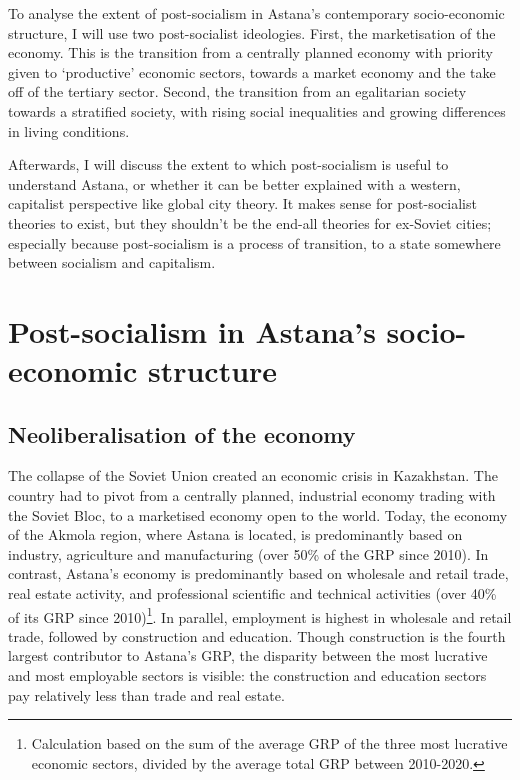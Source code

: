 \documentclass{article}
\begin{document}
To analyse the extent of post-socialism in Astana's contemporary socio-economic structure, I will use two post-socialist ideologies. 
First, the marketisation of the economy. This is the transition from a centrally planned economy with priority given to `productive' economic sectors, towards a market economy and the take off of the tertiary sector. 
Second, the transition from an egalitarian society towards a stratified society, with rising social inequalities and growing differences in living conditions.

Afterwards, I will discuss the extent to which post-socialism is useful to understand Astana, or whether it can be better explained with a western, capitalist perspective like global city theory. 
It makes sense for post-socialist theories to exist, but they shouldn't be the end-all theories for ex-Soviet cities; especially because post-socialism is a process of transition, to a state somewhere between socialism and capitalism.

\section{Post-socialism in Astana's socio-economic structure}

\subsection{Neoliberalisation of the economy}

The collapse of the Soviet Union created an economic crisis in Kazakhstan. The country had to pivot from a centrally planned, industrial economy trading with the Soviet Bloc, to a marketised economy open to the world. Today, the economy of the Akmola region, where Astana is located, is predominantly based on industry, agriculture and manufacturing (over 50\% of the GRP since 2010). In contrast, Astana's economy is predominantly based on wholesale and retail trade, real estate activity, and professional scientific and technical activities (over 40\% of its GRP since 2010)\footnote{Calculation based on the sum of the average GRP of the three most lucrative economic sectors, divided by the average total GRP between 2010-2020.}. In parallel, employment is highest in wholesale and retail trade, followed by construction and education. Though construction is the fourth largest contributor to Astana's GRP, the disparity between the most lucrative and most employable sectors is visible: the construction and education sectors pay relatively less than trade and real estate.
\end{document}
